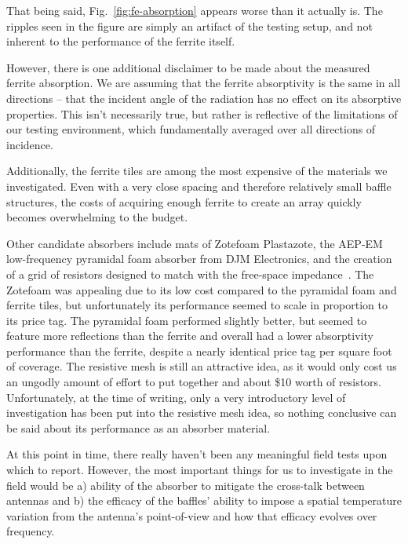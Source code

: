 That being said, Fig.~\ref{fig:fe-absorption} appears worse than it actually 
is. The ripples seen in the figure are simply an artifact of the testing setup, 
and not inherent to the performance of the ferrite itself.

However, there is one additional disclaimer to be made about the measured 
ferrite absorption. We are assuming that the ferrite absorptivity is the same 
in all directions -- that the incident angle of the radiation has no effect on 
its absorptive properties. This isn't necessarily true, but rather is 
reflective of the limitations of our testing environment, which fundamentally 
averaged over all directions of incidence. 

Additionally, the ferrite tiles are among the most expensive of the materials 
we investigated. Even with a very close spacing and therefore relatively small 
baffle structures, the costs of acquiring enough ferrite to create an array 
quickly becomes overwhelming to the budget.

Other candidate absorbers include mats of Zotefoam Plastazote\textregistered, 
the AEP-EM low-frequency pyramidal foam absorber from DJM Electronics, and the 
creation of a grid of resistors designed to match with the free-space 
impedance~\citep{mahesh2015}. The Zotefoam was appealing due to its low cost 
compared to the pyramidal foam and ferrite tiles, but unfortunately its 
performance seemed to scale in proportion to its price tag.  The pyramidal foam 
performed slightly better, but seemed to feature more reflections than the 
ferrite and overall had a lower absorptivity performance than the ferrite, 
despite a nearly identical price tag per square foot of coverage. The resistive 
mesh is still an attractive idea, as it would only cost us an ungodly amount of 
effort to put together and about \$10 worth of resistors. Unfortunately, at the 
time of writing, only a very introductory level of investigation has been put 
into the resistive mesh idea, so nothing conclusive can be said about its 
performance as an absorber material.

At this point in time, there really haven't been any meaningful field tests 
upon which to report. However, the most important things for us to investigate 
in the field would be a) ability of the absorber to mitigate the cross-talk 
between antennas and b) the efficacy of the baffles' ability to impose a 
spatial temperature variation from the antenna's point-of-view and how that 
efficacy evolves over frequency.

